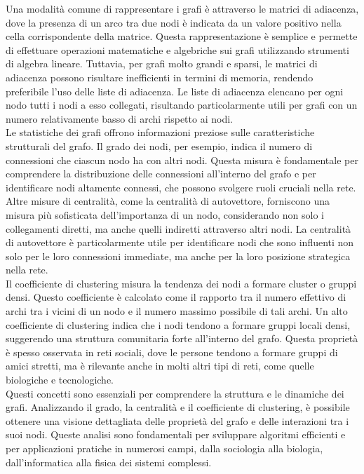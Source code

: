 \documentclass{article}
\begin{document}
Una modalità comune di rappresentare i grafi è attraverso le matrici di adiacenza, dove la presenza di un arco tra due nodi è indicata da un valore positivo nella cella corrispondente della matrice. Questa rappresentazione è semplice e permette di effettuare operazioni matematiche e algebriche sui grafi utilizzando strumenti di algebra lineare. Tuttavia, per grafi molto grandi e sparsi, le matrici di adiacenza possono risultare inefficienti in termini di memoria, rendendo preferibile l'uso delle liste di adiacenza. Le liste di adiacenza elencano per ogni nodo tutti i nodi a esso collegati, risultando particolarmente utili per grafi con un numero relativamente basso di archi rispetto ai nodi.\\
Le statistiche dei grafi offrono informazioni preziose sulle caratteristiche strutturali del grafo. Il grado dei nodi, per esempio, indica il numero di connessioni che ciascun nodo ha con altri nodi. Questa misura è fondamentale per comprendere la distribuzione delle connessioni all'interno del grafo e per identificare nodi altamente connessi, che possono svolgere ruoli cruciali nella rete. Altre misure di centralità, come la centralità di autovettore, forniscono una misura più sofisticata dell'importanza di un nodo, considerando non solo i collegamenti diretti, ma anche quelli indiretti attraverso altri nodi. La centralità di autovettore è particolarmente utile per identificare nodi che sono influenti non solo per le loro connessioni immediate, ma anche per la loro posizione strategica nella rete.\\
Il coefficiente di clustering misura la tendenza dei nodi a formare cluster o gruppi densi. Questo coefficiente è calcolato come il rapporto tra il numero effettivo di archi tra i vicini di un nodo e il numero massimo possibile di tali archi. Un alto coefficiente di clustering indica che i nodi tendono a formare gruppi locali densi, suggerendo una struttura comunitaria forte all'interno del grafo. Questa proprietà è spesso osservata in reti sociali, dove le persone tendono a formare gruppi di amici stretti, ma è rilevante anche in molti altri tipi di reti, come quelle biologiche e tecnologiche.\\
Questi concetti sono essenziali per comprendere la struttura e le dinamiche dei grafi. Analizzando il grado, la centralità e il coefficiente di clustering, è possibile ottenere una visione dettagliata delle proprietà del grafo e delle interazioni tra i suoi nodi. Queste analisi sono fondamentali per sviluppare algoritmi efficienti e per applicazioni pratiche in numerosi campi, dalla sociologia alla biologia, dall'informatica alla fisica dei sistemi complessi.
\end{document}
